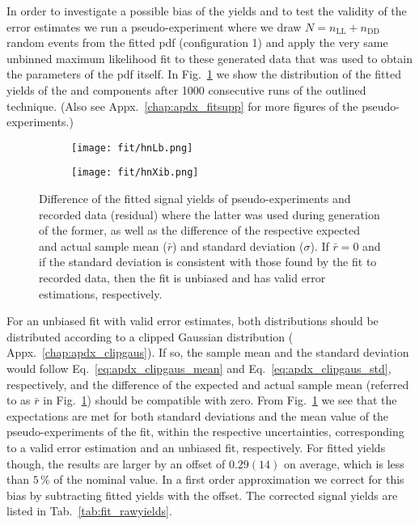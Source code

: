 In order to investigate a possible bias of the yields and to test the validity of the error estimates we run a pseudo-experiment where we draw $N=n_\text{LL} + n_\text{DD}$ random events from the fitted \gls{pdf} (configuration 1) and apply the very same unbinned maximum likelihood fit to these generated data that was used to obtain the parameters of the \gls{pdf} itself. 
In Fig.~\ref{fig:fit_toys_bias} we show the distribution of the fitted yields of the \decay{\Lb}{\Dz\Lz} and \decay{\Xibz}{\Dz\Lz} components after \num{1000} consecutive runs of the outlined technique. (Also see Appx.~\ref{chap:apdx_fitsupp} for more figures of the pseudo-experiments.)
\begin{figure}[htbp]
    \centering
    \begin{subfigure}{.49\textwidth}
        \centering
        \texttt{[image: fit/hnLb.png]}
    \end{subfigure}
    \begin{subfigure}{.49\textwidth}
        \centering
        \texttt{[image: fit/hnXib.png]}
    \end{subfigure}
    \caption{Difference of the fitted signal yields of pseudo-experiments and recorded data (residual) where the latter was used during generation of the former, as well as the difference of the respective expected and actual sample mean ($\bar r$) and standard deviation ($\sigma$). If $\bar r = 0$ and if the standard deviation is consistent with those found by the fit to recorded data, then the fit is unbiased and has valid error estimations, respectively.}
    \label{fig:fit_toys_bias}
\end{figure}
For an unbiased fit with valid error estimates, both distributions should be distributed according to a clipped Gaussian distribution (\cf{} Appx.~\ref{chap:apdx_clipgaus}).
If so, the sample mean and the standard deviation would follow Eq.~\eqref{eq:apdx_clipgaus_mean} and Eq.~\eqref{eq:apdx_clipgaus_std}, respectively, and the difference of the expected and actual sample mean (referred to as $\bar r$ in Fig.~\ref{fig:fit_toys_bias}) should be compatible with zero.
From Fig.~\ref{fig:fit_toys_bias} we see that the expectations are met for both standard deviations and the mean value of the pseudo-experiments of the \decay{\Lb}{\Dz\Lz} fit, within the respective uncertainties, corresponding to a valid error estimation and an unbiased fit, respectively.
For fitted \decay{\Xibz}{\Dz\Lz} yields though, the results are larger by an offset of $0.29(14)$ on average, which is less than $5\,\%$ of the nominal value.
In a first order approximation we correct for this bias by subtracting fitted yields with the offset.
The corrected signal yields are listed in Tab.~\ref{tab:fit_rawyields}.

